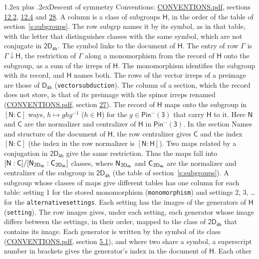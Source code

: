 \documentclass[10pt,a4paper]{article}
\makeatletter
\renewcommand\section{\@startsection{section}{1}{\z@}{-3ex plus -1ex minus -.2ex}%
  {1.2ex plus .2ex}{\normalfont\large\sffamily\bfseries\color{parttitle}}}
\numberwithin{equation}{section}
\newcommand{\grp}[1]{\mathsf{#1}}
\newcommand{\grpindex}[2]{[#1 : #2]}
\newcommand{\restr}[2]{#1\!\downarrow#2}
\newcommand{\hairsp}{\mkern1mu}
\makeatother
\begin{document}
\section{Descent of symmetry}\label{s:subduction}
Conventions: \href{../../CONVENTIONS.pdf}{CONVENTIONS.pdf}, sections \href{../../../rotation/CONVENTIONS.pdf\#conv.12.2}{12.2}, \href{../../../rotation/CONVENTIONS.pdf\#conv.12.4}{12.4} and \href{../../CONVENTIONS.pdf\#conv.28}{28}.
A column is a class of subgroups $\grp{H}$, in the order of the table of section~\ref{s:subgroups}. The row subgrp names it by its symbol, as in that table, with the letter that distinguishes classes with the same symbol, which are not conjugate in $\grp{2D_{4h}}$. The symbol links to the document of $\grp{H}$. The entry of row $\Gamma$ is $\restr{\Gamma}{\grp{H}}$, the restriction of $\Gamma$ along a monomorphism from the record of $\grp{H}$ onto the subgroup, as a sum of the irreps of $\grp{H}$. The monomorphism identifies the subgroup with its record, and $\grp{H}$ names both. The rows of the vector irreps of a preimage are those of \href{../../../rotation/data/pdf/D4h.pdf}{$\grp{D_{4h}}$} (\texttt{vectorsubduction}). The column of a section, which the record does not store, is that of its preimage with the spinor irreps renamed (\href{../../CONVENTIONS.pdf}{CONVENTIONS.pdf}, section \href{../../CONVENTIONS.pdf\#conv.27}{27}). \label{n:group.normalizer.o3}\label{n:group.centralizer.o3}\label{n:element.h}The record of $\grp{H}$ maps onto the subgroup in $\grpindex{\grp{N}}{\grp{C}}$ ways, $h \mapsto g h g^{-1}$ ($h \in \grp{H}$) for the $g \in \grp{Pin^{-}(3)}$ that carry $\grp{H}$ to it. Here $\grp{N}$ and $\grp{C}$ are the normalizer and centralizer of $\grp{H}$ in \href{Pinminus3.pdf}{$\grp{Pin^{-}(3)}$}. In the section Names and structure of the document of $\grp{H}$, the row centralizer gives $\grp{C}$ and the index $\grpindex{\grp{N}}{\grp{C}}$ (the index in the row normalizer is $\grpindex{\grp{N}}{\grp{H}}$). Two maps related by a conjugation in $\grp{2D_{4h}}$ give the same restriction. Thus the maps fall into $\grpindex{\grp{N}}{\grp{C}}/\grpindex{\grp{N}_{\hairsp \grp{2D_{4h}}}}{\grp{C}_{\hairsp \grp{2D_{4h}}}}$ classes, where $\grp{N}_{\hairsp \grp{2D_{4h}}}$ and $\grp{C}_{\hairsp \grp{2D_{4h}}}$ are the normalizer and centralizer of the subgroup in $\grp{2D_{4h}}$ (the table of section~\ref{s:subgroups}). \label{n:head.setting}A subgroup whose classes of maps give different tables has one column for each table: setting 1 for the stored monomorphism (\texttt{monomorphism}) and settings 2, 3, \dots{} for the \texttt{alternativesettings}. Each setting has the images of the generators of $\grp{H}$ (\texttt{setting}). \label{n:head.images}The row images gives, under each setting, each generator whose image differs between the settings, in their order, mapped to the class of $\grp{2D_{4h}}$ that contains its image. \label{n:element.generator.index}Each generator is written by the symbol of its class (\href{../../CONVENTIONS.pdf}{CONVENTIONS.pdf}, section \href{../../../rotation/CONVENTIONS.pdf\#conv.5.1}{5.1}), and where two share a symbol, a superscript number in brackets gives the generator's index in the document of $\grp{H}$. \label{n:irrep.Delta}Each other 
\end{document}
